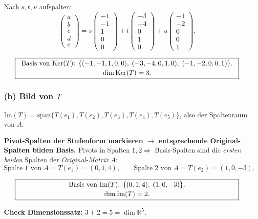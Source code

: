 \documentclass[a4paper,12pt]{article}
\begin{document}
Nach $s, t, u$ aufspalten:
\[
\begin{pmatrix} a \\ b \\ c \\ d \\ e \end{pmatrix}
= s \begin{pmatrix} -1 \\ -1 \\ 1 \\ 0 \\ 0 \end{pmatrix}
+ t \begin{pmatrix} -3 \\ -4 \\ 0 \\ 1 \\ 0 \end{pmatrix}
+ u \begin{pmatrix} -1 \\ -2 \\ 0 \\ 0 \\ 1 \end{pmatrix}.
\]

\[
\fbox{\parbox{0.93\textwidth}{\centering
Basis von $\text{Ker}(T)$: $\{(-1,-1,1,0,0),\;(-3,-4,0,1,0),\;(-1,-2,0,0,1)\}$. \\[2pt]
$\dim \text{Ker}(T) = 3.$
}}
\]

\subsubsection*{(b) Bild von $T$}

$\text{Im}(T) = \text{span}\{T(e_1), T(e_2), T(e_3), T(e_4), T(e_5)\}$, also der Spaltenraum von $A$.

\textbf{Pivot-Spalten der Stufenform markieren $\to$ entsprechende Original-Spalten bilden Basis.} Pivots in Spalten $1, 2 \Rightarrow$ Basis-Spalten sind die \emph{ersten beiden} Spalten der \emph{Original-Matrix} $A$:
\[
\text{Spalte 1 von } A = T(e_1) = (0, 1, 4),\qquad
\text{Spalte 2 von } A = T(e_2) = (1, 0, -3).
\]

\[
\fbox{\parbox{0.93\textwidth}{\centering
Basis von $\text{Im}(T)$: $\{(0, 1, 4),\;(1, 0, -3)\}$. \\[2pt]
$\dim \text{Im}(T) = 2.$
}}
\]

\textbf{Check Dimensionssatz:} $3 + 2 = 5 = \dim \mathbb{R}^5$. \checkmark
\end{document}

